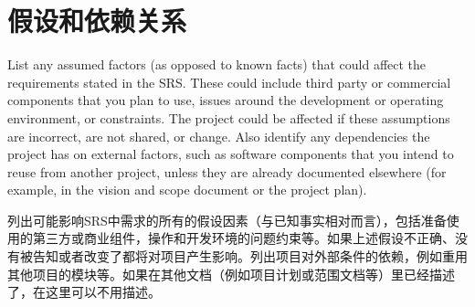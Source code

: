 \section{假设和依赖关系}
List any assumed factors (as opposed to known facts) that could affect the requirements stated in the SRS. These could include third party or commercial components that you plan to use, issues around the development or operating environment, or constraints. The project could be affected if these assumptions are incorrect, are not shared, or change. Also identify any dependencies the project has on external factors, such as software components that you intend to reuse from another project, unless they are already documented elsewhere (for example, in the vision and scope document or the project plan).

列出可能影响SRS中需求的所有的假设因素（与已知事实相对而言），包括准备使用的第三方或商业组件，操作和开发环境的问题约束等。如果上述假设不正确、没有被告知或者改变了都将对项目产生影响。列出项目对外部条件的依赖，例如重用其他项目的模块等。如果在其他文档（例如项目计划或范围文档等）里已经描述了，在这里可以不用描述。
